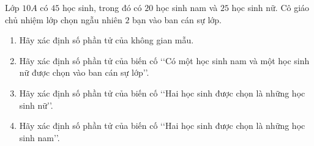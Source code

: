 \begin{bt}%
	Lớp $10A$ có $45$ học sinh, trong đó có $20$ học sinh nam và $25$ học sinh nữ. Cô  giáo chủ nhiệm lớp chọn ngẫu nhiên $2$ bạn vào ban cán sự lớp.
	\begin{enumerate}
		\item Hãy xác định số phần tử của không  gian mẫu.
		\item Hãy xác định số phần tử của biến  cố \lq\lq Có một học sinh nam và một học sinh nữ được chọn vào ban cán sự lớp\rq\rq.
		\item Hãy xác định số phần tử của biến cố \lq\lq Hai học  sinh được chọn là những học sinh nữ\rq\rq.
		\item Hãy xác định số phần tử của biến cố \lq\lq Hai học  sinh được chọn là những học sinh nam\rq\rq.
	\end{enumerate}
\end{bt}

